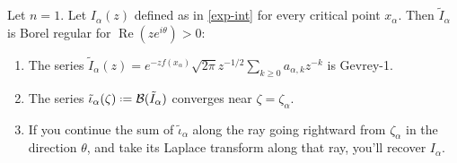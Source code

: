 \documentclass[11pt,a4paper,twoside,leqno,noamsfonts]{amsart}
\numberwithin{equation}{section}
\begin{document}
\begin{theorem}[Theorem ??]\label{thm:maxim} Let $n=1$. Let ${I}_{\alpha}(z)$ defined as in \eqref{exp-int} for every critical point $x_\alpha$. Then $\tilde{I}_\alpha$ is Borel regular for $\operatorname{Re}(ze^{i\theta})>0$:
\begin{enumerate}
\item\label{int:series-gevrey} The series $\tilde{I}_\alpha(z)=e^{-zf(x_\alpha)}\sqrt{2\pi} z^{-1/2}\sum_{k\geq 0}a_{\alpha,k}z^{-k}$ is Gevrey-1.
\item\label{int:resum-converges} The series $\tilde{\iota}_\alpha(\zeta)\defeq\mathcal{B}(\tilde{I}_\alpha)$ converges near $\zeta=\zeta_{\alpha}$.
\item\label{int:resum-valid} If you continue the sum of $\tilde{\iota}_\alpha$ along the ray going rightward from $\zeta_\alpha$ in the direction $\theta$, and take its Laplace transform along that ray, you'll recover $I_\alpha$.
\end{enumerate}
\end{theorem}
\end{document}
